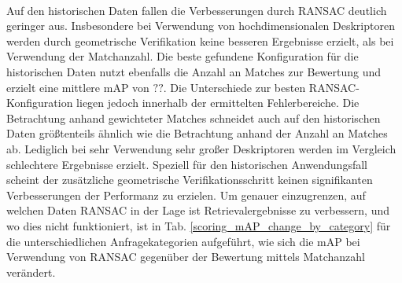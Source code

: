 \\
Auf den historischen Daten fallen die Verbesserungen durch RANSAC deutlich geringer aus. Insbesondere bei Verwendung von hochdimensionalen Deskriptoren werden durch geometrische Verifikation keine besseren Ergebnisse erzielt, als bei Verwendung der Matchanzahl. Die beste gefundene Konfiguration für die historischen Daten nutzt ebenfalls die Anzahl an Matches zur Bewertung und erzielt eine mittlere mAP von $??$. Die Unterschiede zur besten RANSAC-Konfiguration liegen jedoch innerhalb der ermittelten Fehlerbereiche. Die Betrachtung anhand gewichteter Matches schneidet auch auf den historischen Daten größtenteils ähnlich wie die Betrachtung anhand der Anzahl an Matches ab. Lediglich bei sehr Verwendung sehr großer Deskriptoren werden im Vergleich schlechtere Ergebnisse erzielt. Speziell für den historischen Anwendungsfall scheint der zusätzliche geometrische Verifikationsschritt keinen signifikanten Verbesserungen der Performanz zu erzielen.
Um genauer einzugrenzen, auf welchen Daten RANSAC in der Lage ist Retrievalergebnisse zu verbessern, und wo dies nicht funktioniert, ist in Tab. \ref{scoring_mAP_change_by_category} für die unterschiedlichen Anfragekategorien aufgeführt, wie sich die mAP bei Verwendung von RANSAC gegenüber der Bewertung mittels Matchanzahl verändert.
\\
